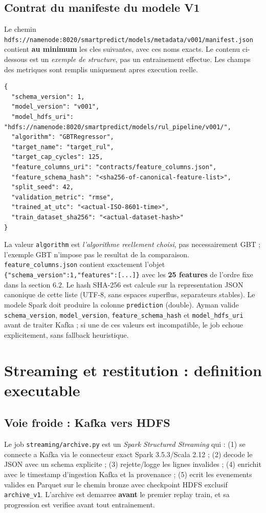 \documentclass[10pt,a4paper]{article}
\newcommand{\code}[1]{{\small\ttfamily\nolinkurl{#1}}}
\begin{document}
\subsection{Contrat du manifeste du modele V1}
Le chemin \code{hdfs://namenode:8020/smartpredict/models/metadata/v001/manifest.json} contient \textbf{au minimum} les cles suivantes, avec ces noms exacts. Le contenu ci-dessous est un \emph{exemple de structure}, pas un entrainement effectue. Les champs des metriques sont remplis uniquement apres execution reelle.
\begin{lstlisting}
{
  "schema_version": 1,
  "model_version": "v001",
  "model_hdfs_uri": "hdfs://namenode:8020/smartpredict/models/rul_pipeline/v001/",
  "algorithm": "GBTRegressor",
  "target_name": "target_rul",
  "target_cap_cycles": 125,
  "feature_columns_uri": "contracts/feature_columns.json",
  "feature_schema_hash": "<sha256-of-canonical-feature-list>",
  "split_seed": 42,
  "validation_metric": "rmse",
  "trained_at_utc": "<actual-ISO-8601-time>",
  "train_dataset_sha256": "<actual-dataset-hash>"
}
\end{lstlisting}
La valeur \code{algorithm} est \emph{l'algorithme reellement choisi}, pas necessairement GBT ; l'exemple GBT n'impose pas le resultat de la comparaison. \code{feature_columns.json} contient exactement l'objet \code{{"schema_version":1,"features":[...]}} avec les \textbf{25 features} de l'ordre fixe dans la section 6.2. Le hash SHA-256 est calcule sur la representation JSON canonique de cette liste (UTF-8, sans espaces superflus, separateurs stables). Le modele Spark doit produire la colonne \code{prediction} (double). Ayman valide \code{schema_version}, \code{model_version}, \code{feature_schema_hash} et \code{model_hdfs_uri} avant de traiter Kafka ; si une de ces valeurs est incompatible, le job echoue explicitement, sans fallback heuristique.

\section{Streaming et restitution : definition executable}
\subsection{Voie froide : Kafka vers HDFS}
Le job \code{streaming/archive.py} est un \emph{Spark Structured Streaming} qui : (1) se connecte a Kafka via le connecteur exact Spark 3.5.3/Scala 2.12 ; (2) decode le JSON avec un schema explicite ; (3) rejette/logge les lignes invalides ; (4) enrichit avec le timestamp d'ingestion Kafka et la provenance ; (5) ecrit les evenements valides en Parquet sur le chemin bronze avec checkpoint HDFS exclusif \code{archive_v1}. L'archive est demarree \textbf{avant} le premier replay train, et sa progression est verifiee avant tout entrainement.
\end{document}
